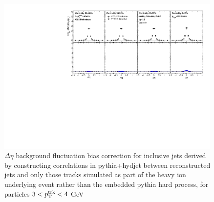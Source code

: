                 \begin{figure}[hbtp] 
                \begin{center}\includegraphics[width=0.99\textwidth]{figures/JFF_SpillOver/AN_Closures_Eta_InclusiveTrkPt3_TrkPt4.pdf}
               \caption[Background fluctuation bias corrections for particles with $3<p_{\rm T}^{\rm trk}<4$ GeV]{$\Delta\eta$ background fluctuation bias correction for inclusive jets derived by constructing correlations in {\sc pythia+hydjet} between reconstructed jets and only those tracks simulated as part of the heavy ion underlying event rather than the embedded {\sc pythia} hard process, for particles $3<p_{\rm T}^{\rm trk}<4$ GeV}

                  \label{fig:reco_reco_closure_inc3}
                  \end{center}
                  \end{figure}


